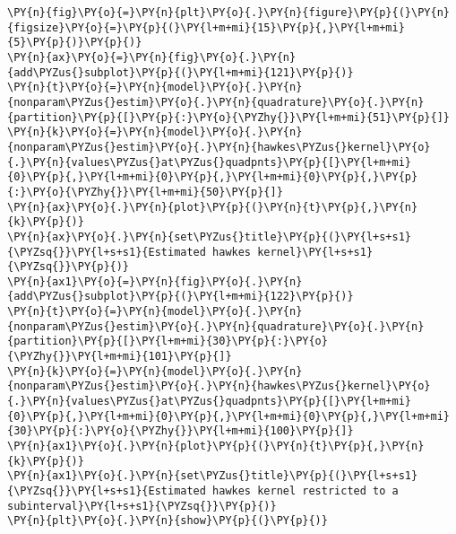 \documentclass[10pt, article,table]{article}
\begin{document}
    \begin{tcolorbox}[breakable, size=fbox, boxrule=1pt, pad at break*=1mm,colback=cellbackground, colframe=cellborder]
\begin{Verbatim}[commandchars=\\\{\}]
\PY{n}{fig}\PY{o}{=}\PY{n}{plt}\PY{o}{.}\PY{n}{figure}\PY{p}{(}\PY{n}{figsize}\PY{o}{=}\PY{p}{(}\PY{l+m+mi}{15}\PY{p}{,}\PY{l+m+mi}{5}\PY{p}{)}\PY{p}{)}
\PY{n}{ax}\PY{o}{=}\PY{n}{fig}\PY{o}{.}\PY{n}{add\PYZus{}subplot}\PY{p}{(}\PY{l+m+mi}{121}\PY{p}{)}
\PY{n}{t}\PY{o}{=}\PY{n}{model}\PY{o}{.}\PY{n}{nonparam\PYZus{}estim}\PY{o}{.}\PY{n}{quadrature}\PY{o}{.}\PY{n}{partition}\PY{p}{[}\PY{p}{:}\PY{o}{\PYZhy{}}\PY{l+m+mi}{51}\PY{p}{]}
\PY{n}{k}\PY{o}{=}\PY{n}{model}\PY{o}{.}\PY{n}{nonparam\PYZus{}estim}\PY{o}{.}\PY{n}{hawkes\PYZus{}kernel}\PY{o}{.}\PY{n}{values\PYZus{}at\PYZus{}quadpnts}\PY{p}{[}\PY{l+m+mi}{0}\PY{p}{,}\PY{l+m+mi}{0}\PY{p}{,}\PY{l+m+mi}{0}\PY{p}{,}\PY{p}{:}\PY{o}{\PYZhy{}}\PY{l+m+mi}{50}\PY{p}{]}
\PY{n}{ax}\PY{o}{.}\PY{n}{plot}\PY{p}{(}\PY{n}{t}\PY{p}{,}\PY{n}{k}\PY{p}{)}
\PY{n}{ax}\PY{o}{.}\PY{n}{set\PYZus{}title}\PY{p}{(}\PY{l+s+s1}{\PYZsq{}}\PY{l+s+s1}{Estimated hawkes kernel}\PY{l+s+s1}{\PYZsq{}}\PY{p}{)}
\PY{n}{ax1}\PY{o}{=}\PY{n}{fig}\PY{o}{.}\PY{n}{add\PYZus{}subplot}\PY{p}{(}\PY{l+m+mi}{122}\PY{p}{)}
\PY{n}{t}\PY{o}{=}\PY{n}{model}\PY{o}{.}\PY{n}{nonparam\PYZus{}estim}\PY{o}{.}\PY{n}{quadrature}\PY{o}{.}\PY{n}{partition}\PY{p}{[}\PY{l+m+mi}{30}\PY{p}{:}\PY{o}{\PYZhy{}}\PY{l+m+mi}{101}\PY{p}{]}
\PY{n}{k}\PY{o}{=}\PY{n}{model}\PY{o}{.}\PY{n}{nonparam\PYZus{}estim}\PY{o}{.}\PY{n}{hawkes\PYZus{}kernel}\PY{o}{.}\PY{n}{values\PYZus{}at\PYZus{}quadpnts}\PY{p}{[}\PY{l+m+mi}{0}\PY{p}{,}\PY{l+m+mi}{0}\PY{p}{,}\PY{l+m+mi}{0}\PY{p}{,}\PY{l+m+mi}{30}\PY{p}{:}\PY{o}{\PYZhy{}}\PY{l+m+mi}{100}\PY{p}{]}
\PY{n}{ax1}\PY{o}{.}\PY{n}{plot}\PY{p}{(}\PY{n}{t}\PY{p}{,}\PY{n}{k}\PY{p}{)}
\PY{n}{ax1}\PY{o}{.}\PY{n}{set\PYZus{}title}\PY{p}{(}\PY{l+s+s1}{\PYZsq{}}\PY{l+s+s1}{Estimated hawkes kernel restricted to a subinterval}\PY{l+s+s1}{\PYZsq{}}\PY{p}{)}
\PY{n}{plt}\PY{o}{.}\PY{n}{show}\PY{p}{(}\PY{p}{)}
\end{Verbatim}
\end{tcolorbox}

    \begin{center}
    \end{center}
    { \hspace*{\fill} \\}
\end{document}
